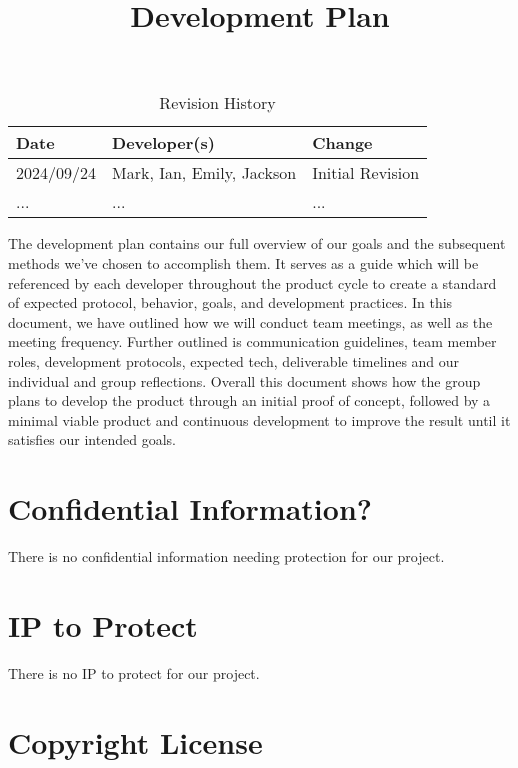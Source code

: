 \documentclass{article}
\title{Development Plan\\\progname}
\author{\authname}
\date{}
\begin{document}
\maketitle

\begin{table}[hp]
\caption{Revision History} \label{TblRevisionHistory}
\begin{tabularx}{\textwidth}{llX}
\toprule
\textbf{Date} & \textbf{Developer(s)} & \textbf{Change}\\
\midrule
2024/09/24 & Mark, Ian, Emily, Jackson & Initial Revision\\
... & ... & ...\\
\bottomrule
\end{tabularx}
\end{table}

\newpage{}

The development plan contains our full overview of our goals and the subsequent methods we’ve chosen to accomplish them. 
It serves as a guide which will be referenced by each developer throughout the product cycle to create a standard of expected protocol, behavior, goals, and development practices. 
In this document, we have outlined how we will conduct team meetings, as well as the meeting frequency. Further outlined is communication guidelines, team member roles, development protocols, expected tech, deliverable timelines and our individual and group reflections. 
Overall this document shows how the group plans to develop the product through an initial proof of concept, followed by a minimal viable product and continuous development to improve the result until it satisfies our intended goals.

\section{Confidential Information?}

There is no confidential information needing protection for our project.

\section{IP to Protect}

There is no IP to protect for our project.

\section{Copyright License}
\end{document}
